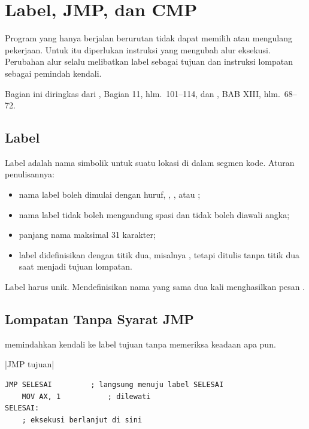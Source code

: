 \section{Label, JMP, dan CMP}
\label{sec:label-jmp-cmp}

Program yang hanya berjalan berurutan tidak dapat memilih atau
mengulang pekerjaan. Untuk itu diperlukan instruksi yang mengubah
alur eksekusi. Perubahan alur selalu melibatkan label sebagai tujuan
dan instruksi lompatan sebagai pemindah kendali.

Bagian ini diringkas dari \cite{gunawan2019}, Bagian 11,
hlm.~101--114, dan \cite{sto2001}, BAB XIII, hlm.~68--72.

\subsection{Label}

Label adalah nama simbolik untuk suatu lokasi di dalam segmen kode.
Aturan penulisannya:

\begin{itemize}
    \item nama label boleh dimulai dengan huruf, , \code{\_},
          atau ;
    \item nama label tidak boleh mengandung spasi dan tidak boleh
          diawali angka;
    \item panjang nama maksimal 31 karakter;
    \item label didefinisikan dengan titik dua, misalnya
          , tetapi ditulis tanpa titik dua saat menjadi
          tujuan lompatan.
\end{itemize}

Label harus unik. Mendefinisikan nama yang sama dua kali menghasilkan
pesan .

\subsection{Lompatan Tanpa Syarat JMP}

 memindahkan kendali ke label tujuan tanpa memeriksa
keadaan apa pun.

\begin{center}
\lstasm|JMP tujuan|
\end{center}

\begin{lstlisting}[language=MASM, numbers=none]
    JMP SELESAI         ; langsung menuju label SELESAI
    MOV AX, 1           ; dilewati
SELESAI:
    ; eksekusi berlanjut di sini
\end{lstlisting}

